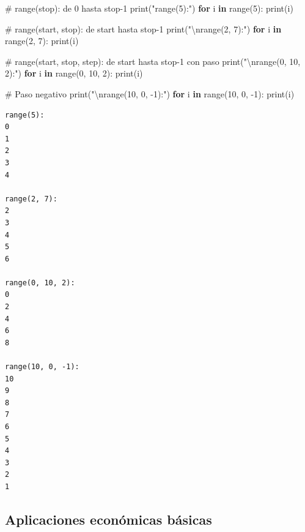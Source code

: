 \documentclass[
  doc,
  floatsintext,
  longtable,
  a4paper,
  nolmodern,
  notxfonts,
  notimes,
  12pt,
  colorlinks=true,linkcolor=blue,citecolor=blue,urlcolor=blue]{apa7}
\newenvironment{Shaded}{\begin{snugshade}}{\end{snugshade}}
\newcommand{\BuiltInTok}[1]{\textcolor[rgb]{0.00,0.23,0.31}{#1}}
\newcommand{\CharTok}[1]{\textcolor[rgb]{0.13,0.47,0.30}{#1}}
\newcommand{\CommentTok}[1]{\textcolor[rgb]{0.37,0.37,0.37}{#1}}
\newcommand{\ControlFlowTok}[1]{\textcolor[rgb]{0.00,0.23,0.31}{\textbf{#1}}}
\newcommand{\DecValTok}[1]{\textcolor[rgb]{0.68,0.00,0.00}{#1}}
\newcommand{\KeywordTok}[1]{\textcolor[rgb]{0.00,0.23,0.31}{\textbf{#1}}}
\newcommand{\NormalTok}[1]{\textcolor[rgb]{0.00,0.23,0.31}{#1}}
\newcommand{\OperatorTok}[1]{\textcolor[rgb]{0.37,0.37,0.37}{#1}}
\newcommand{\StringTok}[1]{\textcolor[rgb]{0.13,0.47,0.30}{#1}}
\begin{document}
\begin{Shaded}
\begin{Highlighting}[]
\CommentTok{\# range(stop): de 0 hasta stop{-}1}
\BuiltInTok{print}\NormalTok{(}\StringTok{"range(5):"}\NormalTok{)}
\ControlFlowTok{for}\NormalTok{ i }\KeywordTok{in} \BuiltInTok{range}\NormalTok{(}\DecValTok{5}\NormalTok{):}
    \BuiltInTok{print}\NormalTok{(i)}

\CommentTok{\# range(start, stop): de start hasta stop{-}1}
\BuiltInTok{print}\NormalTok{(}\StringTok{"}\CharTok{\textbackslash{}n}\StringTok{range(2, 7):"}\NormalTok{)}
\ControlFlowTok{for}\NormalTok{ i }\KeywordTok{in} \BuiltInTok{range}\NormalTok{(}\DecValTok{2}\NormalTok{, }\DecValTok{7}\NormalTok{):}
    \BuiltInTok{print}\NormalTok{(i)}

\CommentTok{\# range(start, stop, step): de start hasta stop{-}1 con paso}
\BuiltInTok{print}\NormalTok{(}\StringTok{"}\CharTok{\textbackslash{}n}\StringTok{range(0, 10, 2):"}\NormalTok{)}
\ControlFlowTok{for}\NormalTok{ i }\KeywordTok{in} \BuiltInTok{range}\NormalTok{(}\DecValTok{0}\NormalTok{, }\DecValTok{10}\NormalTok{, }\DecValTok{2}\NormalTok{):}
    \BuiltInTok{print}\NormalTok{(i)}

\CommentTok{\# Paso negativo}
\BuiltInTok{print}\NormalTok{(}\StringTok{"}\CharTok{\textbackslash{}n}\StringTok{range(10, 0, {-}1):"}\NormalTok{)}
\ControlFlowTok{for}\NormalTok{ i }\KeywordTok{in} \BuiltInTok{range}\NormalTok{(}\DecValTok{10}\NormalTok{, }\DecValTok{0}\NormalTok{, }\OperatorTok{{-}}\DecValTok{1}\NormalTok{):}
    \BuiltInTok{print}\NormalTok{(i)}
\end{Highlighting}
\end{Shaded}

\begin{verbatim}
range(5):
0
1
2
3
4

range(2, 7):
2
3
4
5
6

range(0, 10, 2):
0
2
4
6
8

range(10, 0, -1):
10
9
8
7
6
5
4
3
2
1
\end{verbatim}

\subsection{Aplicaciones económicas
básicas}\label{aplicaciones-econuxf3micas-buxe1sicas}
\end{document}
